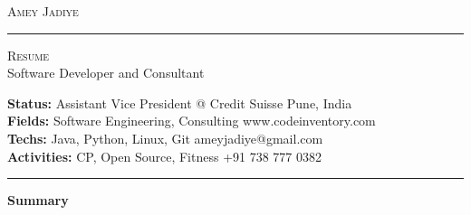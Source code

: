 \documentclass[10pt,A4]{article}
\newcommand{\cvsection}[1]
{
	\begin{center}
		\large\textcolor{sectcol}{\textbf{#1}}
	\end{center}
}
\newcommand{\metasection}[2]
{
\footnotesize{#2} \hspace*{\fill} \footnotesize{#1}\\[1pt]
}
\begin{document}
\pagestyle{fancy}	








\vspace{-8pt}
\begin{center}
	\HUGE \textsc{Amey Jadiye} \textcolor{sectcol}{\rule[-1mm]{1mm}{0.9cm}} \textsc{Resume}\\[2pt]
	\small Software Developer and Consultant
\end{center}



\vspace{6pt}


\metasection{Pune, India}{\textbf{Status:} Assistant Vice President @ Credit Suisse}
\metasection{www.codeinventory.com}{\textbf{Fields:} Software Engineering, Consulting} 
\metasection{ameyjadiye@gmail.com}{\textbf{Techs:} Java, Python, Linux, Git}
\metasection{+91 738 777 0382}{\textbf{Activities:} CP, Open Source, Fitness}
\vspace{-2pt}
\textcolor{softcol}{\hrule}
\vspace{6pt}

\normalsize

\vspace{-6pt}
\cvsection{Summary}
\end{document}
